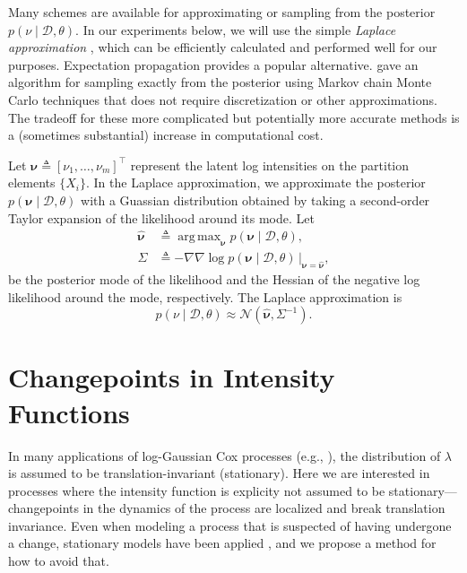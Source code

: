 \documentclass{article}
\newcommand{\deq}{\triangleq}
\newcommand{\cm}[1]{\mathcal{#1}}
\newcommand{\data}{\cm{D}}
\newcommand{\given}{\mid}
\DeclareMathOperator*{\argmax}{arg\,max}
\begin{document}
Many schemes are available for approximating or sampling from the
posterior $p(\nu \given \data, \theta)$.  In our experiments below, we
will use the simple \emph{Laplace approximation}
\citep{williamsbarber}, which can be efficiently calculated and
performed well for our purposes.  Expectation propagation
\citep{minka} provides a popular alternative.  \citet{adams} gave an
algorithm for sampling exactly from the posterior using Markov chain
Monte Carlo techniques that does not require discretization or other
approximations.  The tradeoff for these more complicated but
potentially more accurate methods is a (sometimes substantial)
increase in computational cost.

Let $\bm{\nu} \deq [\nu_1, \dotsc, \nu_m]^\top$ represent the latent
log intensities on the partition elements $\lbrace X_i \rbrace$.  In
the Laplace approximation, we approximate the posterior $p(\bm{\nu}
\given \data, \theta)$ with a Guassian distribution obtained by taking
a second-order Taylor expansion of the likelihood around its mode.
Let
\begin{align*}
  \hat{\bm{\nu}}
  &\deq 
  \argmax_{\bm{\nu}} p(\bm{\nu} \given \data, \theta), \\
  \Sigma 
  &\deq 
  -\nabla\nabla \log p(\bm{\nu} \given \data, \theta)
  \,
  \Bigr\rvert_{\bm{\nu} = \hat{\bm{\nu}}},
\end{align*}
be the posterior mode of the likelihood and the Hessian of the
negative log likelihood around the mode, respectively.  The Laplace
approximation is 
\begin{equation*}
  p(\nu \given \data, \theta) 
  \approx
  \cm{N}(\hat{\bm{\nu}}, \Sigma^{-1}).
\end{equation*}

\section{Changepoints in Intensity Functions}

In many applications of log-Gaussian Cox processes (e.g.,
\citep{moller, adams}), the distribution of $\lambda$ is assumed to be
translation-invariant (stationary).  Here we are interested in
processes where the intensity function is explicity not assumed to be
stationary---changepoints in the dynamics of the process are localized
and break translation invariance.  Even when modeling a process that
is suspected of having undergone a change, stationary models have been
applied \citep{adams}, and we propose a method for how to avoid that.
\end{document}
